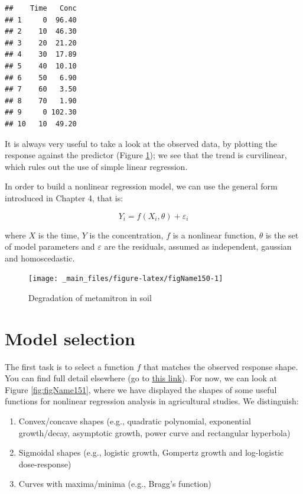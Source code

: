 \documentclass[a4paper,12pt,oneside]{book}
\providecommand{\tightlist}{%
  \setlength{\itemsep}{0pt}\setlength{\parskip}{0pt}}
\begin{document}
\begin{verbatim}
##    Time   Conc
## 1     0  96.40
## 2    10  46.30
## 3    20  21.20
## 4    30  17.89
## 5    40  10.10
## 6    50   6.90
## 7    60   3.50
## 8    70   1.90
## 9     0 102.30
## 10   10  49.20
\end{verbatim}

It is always very useful to take a look at the observed data, by plotting the response against the predictor (Figure \ref{fig:figName150}); we see that the trend is curvilinear, which rules out the use of simple linear regression.

In order to build a nonlinear regression model, we can use the general form introduced in Chapter 4, that is:

\[Y_i = f(X_i, \theta) + \varepsilon_i\]

where \(X\) is the time, \(Y\) is the concentration, \(f\) is a nonlinear function, \(\theta\) is the set of model parameters and \(\varepsilon\) are the residuals, assumed as independent, gaussian and homoscedastic.

\begin{figure}

{\centering \texttt{[image: \_main\_files/figure-latex/figName150-1]} 

}

\caption{Degradation of metamitron in soil}\label{fig:figName150}
\end{figure}

\hypertarget{model-selection}{%
\section{Model selection}\label{model-selection}}

The first task is to select a function \(f\) that matches the observed response shape. You can find full detail elsewhere (go to \href{https://www.statforbiology.com/2020/stat_nls_usefulfunctions/}{this link}). For now, we can look at Figure \ref{fig:figName151}, where we have displayed the shapes of some useful functions for nonlinear regression analysis in agricultural studies. We distinguish:

\begin{enumerate}
\def\labelenumi{\arabic{enumi}.}
\tightlist
\item
  Convex/concave shapes (e.g., quadratic polynomial, exponential growth/decay, asymptotic growth, power curve and rectangular hyperbola)
\item
  Sigmoidal shapes (e.g., logistic growth, Gompertz growth and log-logistic dose-response)
\item
  Curves with maxima/minima (e.g., Bragg's function)
\end{enumerate}
\end{document}
